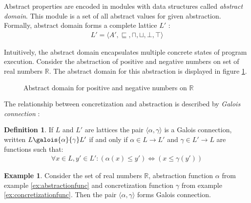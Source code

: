 \documentclass[12pt,final,oneside]{fithesis2}
\theoremstyle{definition}
\newtheorem{definition}{Definition}[chapter]
\newtheorem{example}{Example}[chapter]
\begin{document}
Abstract properties are encoded in modules with data structures called
\textit{abstract domain}. This module is a set of all abstract values
for given abstraction. Formally, abstract domain forms a complete
lattice $L'$ \cite{Constantini11-1}:
\begin{align*}
L' = \langle A', \sqsubseteq, \sqcap, \sqcup, \bot, \top \rangle
\end{align*}

Intuitively, the abstract domain encapsulates multiple concrete states of
program execution. Consider the abstraction of positive and negative
numbers on set of real numbers $\mathbb{R}$. The abstract domain for this
abstraction is displayed in figure \ref{fig:abstractdomain}.

\begin{figure}[ht]
\centering
{}
\caption{Abstract domain for positive and negative numbers on $\mathbb{R}$~\cite{CousotCousot77-1}}
\label{fig:abstractdomain}
\end{figure}

The relationship between concretization and abstraction is described by
\textit{Galois connection} \cite{CousotCousot92-4}:

\begin{definition}
If $L$ and $L'$ are lattices the pair $\langle \alpha, \gamma \rangle$ is
a Galois connection, written $L \galois{\alpha}{\gamma} L'$ if and only if
$\alpha \in L \to L'$ and $\gamma \in L' \to L$ are functions such that:
\begin{align*}
\forall x \in L, y' \in L': (\alpha(x) \leq y') \iff (x \leq \gamma(y'))
\end{align*}
\end{definition}

\begin{example}
Consider the set of real numbers $\mathbb{R}$, abstraction function
$\alpha$ from example \ref{ex:abstractionfunc} and concretization function
$\gamma$ from example \ref{ex:concretizationfunc}. Then the pair
$\langle \alpha, \gamma \rangle$ forms Galois connection.
\end{example}
\end{document}
